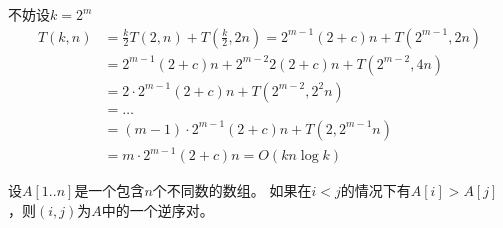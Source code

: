 \begin{questions}
\begin{parts}
\begin{solution}
            不妨设$k = 2^m$
            \begin{align*}
                T(k,n) & = \frac{k}{2} T(2,n) + T \left(\frac{k}{2}, 2n\right) = 2^{m-1} (2+c)n + T \left(2^{m-1} , 2n\right) \\
                       & = 2^{m-1} (2+c)n + 2^{m-2} 2(2+c)n + T \left(2^{m-2} , 4n\right)                                     \\
                       & = 2 \cdot 2^{m-1} (2+c)n + T \left(2^{m-2} , 2^2 n\right)                                            \\
                       & = \dots                                                                                              \\
                       & = (m-1) \cdot 2^{m-1} (2+c)n + T \left(2, 2^{m-1} n\right)                                           \\
                       & = m \cdot 2^{m-1} (2+c)n = O(k n \log {k})
            \end{align*}
        \end{solution}
    \end{parts}


    \question 设$A[1..n]$是一个包含$n$个不同数的数组。
    如果在$i<j$的情况下有$A[i]>A[j]$，则$(i,j)$为$A$中的一个逆序对。
\end{questions}
